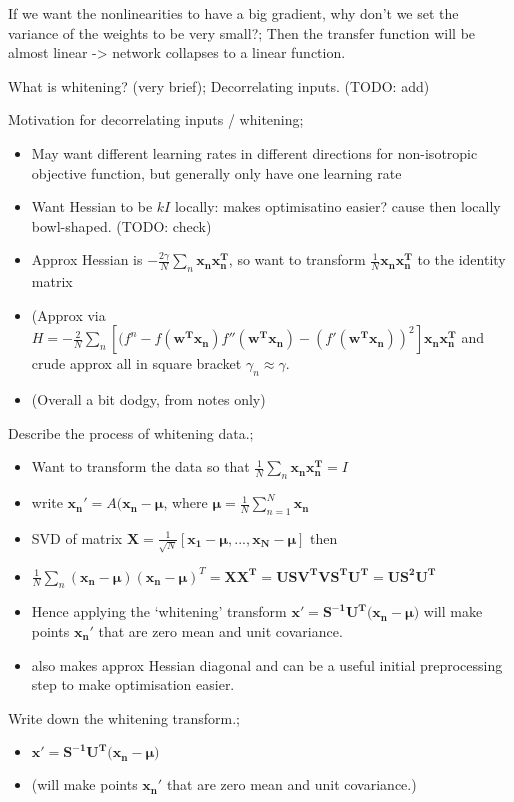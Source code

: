 \documentclass{article}
\begin{document}
If we want the nonlinearities to have a big gradient, why don't we set the variance of the weights to be very small?; Then the transfer function will be almost linear -> network collapses to a linear function.

What is whitening? (very brief); Decorrelating inputs. (TODO: add)

Motivation for decorrelating inputs / whitening; \begin{itemize}
    \item May want different learning rates in different directions for non-isotropic objective function, but generally only have one learning rate
    \item Want Hessian to be $kI$ locally: makes optimisatino easier? cause then locally bowl-shaped. (TODO: check)
    \item Approx Hessian is $-\frac{2\gamma}{N}\sum_n \mathbf{x_nx_n^T}$, so want to transform $\frac{1}{N}\mathbf{x_nx_n^T}$ to the identity matrix
    \item (Approx via $H=-\frac{2}{N}\sum_n[(f^n - f(\mathbf{w^Tx_n})f''(\mathbf{w^Tx_n}) - (f'(\mathbf{w^Tx_n}))^2]\mathbf{x_nx_n^T}$ and crude approx all in square bracket $\gamma_n \approx \gamma$.
    \item (Overall a bit dodgy, from notes only)
\end{itemize}

Describe the process of whitening data.; \begin{itemize}
    \item Want to transform the data so that $\frac{1}{N}\sum_n \mathbf{x_nx_n^T} = I$
    \item write $\mathbf{x_n}' = A(\mathbf{x_n - \mu}$, where $\mathbf{\mu}=\frac{1}{N}\sum_{n=1}^N\mathbf{x_n}$
    \item SVD of matrix $\mathbf{X}=\frac{1}{\sqrt{N}}[\mathbf{x_1 - \mu, ..., x_N - \mu}]$ then 
    \item $\frac{1}{N}\sum_n(\mathbf{x_n - \mu})(\mathbf{x_n - \mu})^T = \mathbf{XX^T = USV^TVS^TU^T = US^2U^T}$
    \item Hence applying the `whitening' transform $\mathbf{x'} = \mathbf{S^{-1}U^T(x_n - \mu})$ will make points $\mathbf{x_n}'$ that are zero mean and unit covariance.
    \item also makes approx Hessian diagonal and can be a useful initial preprocessing step to make optimisation easier.
\end{itemize}

Write down the whitening transform.; \begin{itemize}
    \item $\mathbf{x'} = \mathbf{S^{-1}U^T(x_n - \mu})$ 
    \item (will make points $\mathbf{x_n}'$ that are zero mean and unit covariance.)
\end{itemize} 
\end{document}
